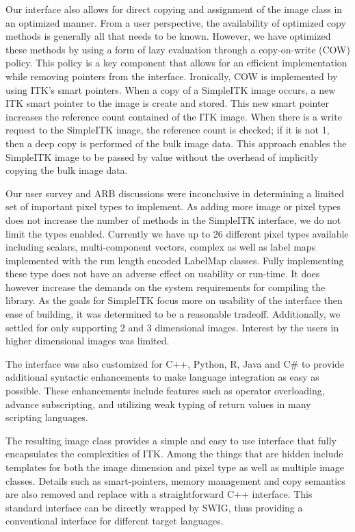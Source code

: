 \documentclass{frontiersMED} %
\begin{document}
Our interface also allows for direct copying and assignment of the
image class in an optimized manner. From a user perspective, the
availability of optimized copy methods is generally all that needs to
be known. However, we have optimized these methods by using a form of
lazy evaluation through a copy-on-write (COW)  policy. This policy is
a key component that allows for an efficient implementation while
removing pointers from the interface. Ironically, COW is implemented
by using ITK’s smart pointers. When a copy of a SimpleITK image
occurs, a new ITK smart pointer to the image is create and
stored. This new smart pointer increases the reference count contained
of the ITK image. When there is a write request to the SimpleITK
image, the reference count is checked; if it is not 1, then a deep
copy is performed of the bulk image data. This approach enables the
SimpleITK image to be passed by value without the overhead of
implicitly copying the bulk image data.

Our user survey and ARB discussions were inconclusive in determining a
limited set of important pixel types to implement. As adding more
image or pixel types does not increase the number of methods in the
SimpleITK interface, we do not limit the types enabled. Currently we
have up to 26 different pixel types available including scalars,
multi-component vectors, complex as well as label maps implemented
with the run length encoded LabelMap classes. Fully implementing these
type does not have an adverse effect on usability or run-time. It does
however increase the demands on the system requirements for compiling
the library. As the goals for SimpleITK focus more on usability of the
interface then ease of building, it was determined to be a reasonable
tradeoff. Additionally, we settled for only supporting 2 and 3
dimensional images. Interest by the users in higher dimensional images
was limited.

The interface was also customized for C++, Python, R, Java and C\# to
provide additional syntactic enhancements to make language integration
as easy as possible. These enhancements include features such as
operator overloading, advance subscripting, and utilizing weak typing
of return values in many scripting languages.

The resulting image class provides a simple and easy to use interface
that fully encapsulates the complexities of ITK. Among the things that
are hidden include templates for both the image dimension and pixel
type as well as multiple image classes. Details such as
smart-pointers, memory management and copy semantics are also removed
and replace with a straightforward C++ interface. This standard
interface can be directly wrapped by SWIG, thus providing a
conventional interface for different target languages.
\end{document}
